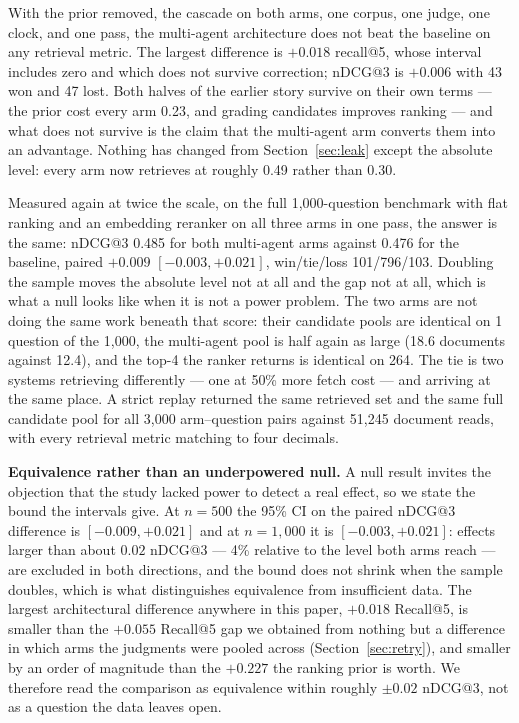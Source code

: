 \documentclass[10pt,conference]{IEEEtran}
\begin{document}
With the prior removed, the cascade on both arms, one corpus, one judge, one
clock, and one pass, the multi-agent architecture does not beat the baseline on
any retrieval metric. The largest difference is $+0.018$ recall@5, whose interval
includes zero and which does not survive correction; nDCG@3 is $+0.006$ with 43
won and 47 lost. Both halves of the earlier story survive on their own terms ---
the prior cost every arm 0.23, and grading candidates improves ranking --- and
what does not survive is the claim that the multi-agent arm converts them into an
advantage. Nothing has changed from Section~\ref{sec:leak} except the absolute
level: every arm now retrieves at roughly 0.49 rather than 0.30.

Measured again at twice the scale, on the full 1{,}000-question benchmark with
flat ranking and an embedding reranker on all three arms in one pass, the answer
is the same: nDCG@3 0.485 for both multi-agent arms against 0.476 for the
baseline, paired $+0.009$ $[-0.003,+0.021]$, win/tie/loss 101/796/103. Doubling
the sample moves the absolute level not at all and the gap not at all, which is
what a null looks like when it is not a power problem. The two arms are not doing
the same work beneath that score: their candidate pools are identical on 1
question of the 1{,}000, the multi-agent pool is half again as large (18.6
documents against 12.4), and the top-4 the ranker returns is identical on 264. The
tie is two systems retrieving differently --- one at 50\% more fetch cost --- and
arriving at the same place. A strict replay returned the same retrieved set and
the same full candidate pool for all 3{,}000 arm--question pairs against 51{,}245
document reads, with every retrieval metric matching to four decimals.

\textbf{Equivalence rather than an underpowered null.} A null result invites the
objection that the study lacked power to detect a real effect, so we state the
bound the intervals give. At $n=500$ the 95\% CI on the paired nDCG@3 difference is
$[-0.009,+0.021]$ and at $n=1{,}000$ it is $[-0.003,+0.021]$: effects larger than
about $0.02$ nDCG@3 --- 4\% relative to the level both arms reach --- are excluded
in both directions, and the bound does not shrink when the sample doubles, which is
what distinguishes equivalence from insufficient data. The largest architectural
difference anywhere in this paper, $+0.018$ Recall@5, is smaller than the
$+0.055$ Recall@5 gap we obtained from nothing but a difference in which arms the
judgments were pooled across (Section~\ref{sec:retry}), and smaller by an order of
magnitude than the $+0.227$ the ranking prior is worth. We therefore read the
comparison as equivalence within roughly $\pm 0.02$ nDCG@3, not as a question the
data leaves open.
\end{document}
